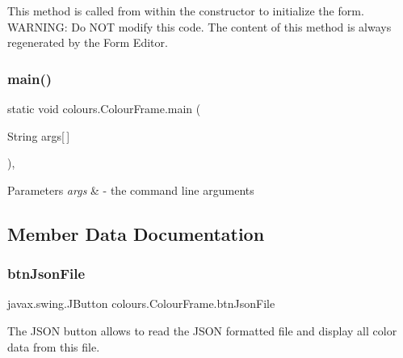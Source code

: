 This method is called from within the constructor to initialize the form. W\+A\+R\+N\+I\+NG\+: Do N\+OT modify this code. The content of this method is always regenerated by the Form Editor. \mbox{\label{classcolours_1_1_colour_frame_a7f890970aa168fcb9791f1de589a5c2c}} 
\subsubsection{\texorpdfstring{main()}{main()}}
{\footnotesize\ttfamily static void colours.\+Colour\+Frame.\+main (\begin{DoxyParamCaption}\item[{String}]{args\mbox{[}$\,$\mbox{]} }\end{DoxyParamCaption})\hspace{0.3cm}{\ttfamily [inline]}, {\ttfamily [static]}}


\begin{DoxyParams}{Parameters}
{\em args} & -\/ the command line arguments \\
\hline
\end{DoxyParams}


\subsection{Member Data Documentation}
\mbox{\label{classcolours_1_1_colour_frame_a1fe23149a50772dff538d0004e7cb1ee}} 
\subsubsection{\texorpdfstring{btn\+Json\+File}{btnJsonFile}}
{\footnotesize\ttfamily javax.\+swing.\+J\+Button colours.\+Colour\+Frame.\+btn\+Json\+File\hspace{0.3cm}{\ttfamily [private]}}

The J\+S\+ON button allows to read the J\+S\+ON formatted file and display all color data from this file. \mbox{\label{classcolours_1_1_colour_frame_a3465e8e9a196ae2a3249b5212e954594}} 
